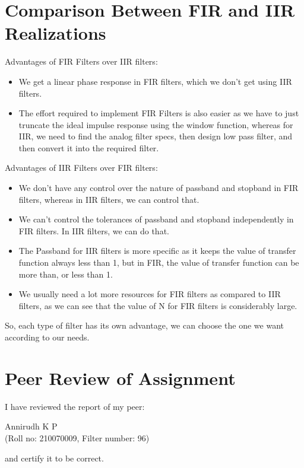\documentclass{article}
\begin{document}
\clearpage

\section{Comparison Between FIR and IIR Realizations}

Advantages of FIR Filters over IIR filters:
\begin{itemize}
    \item We get a linear phase response in FIR filters, which we don't get using IIR filters.
    \item The effort required to implement FIR Filters is also easier as we have to just truncate the ideal impulse response using the window function, whereas for IIR, we need to find the analog filter specs, then design low pass filter, and then convert it into the required filter.
\end{itemize}

Advantages of IIR Filters over FIR filters:
\begin{itemize}
    \item We don't have any control over the nature of passband and stopband in FIR filters, whereas in IIR filters, we can control that.
    \item We can't control the tolerances of passband and stopband independently in FIR filters. In IIR filters, we can do that.
    \item The Passband for IIR filters is more specific as it keeps the value of transfer function always less than 1, but in FIR, the value of transfer function can be more than, or less than 1.
    \item We usually need a lot more resources for FIR filters as compared to IIR filters, as we can see that the value of N for FIR filters is considerably large.
\end{itemize}

So, each type of filter has its own advantage, we can choose the one we want according to our needs.

\section{Peer Review of Assignment}

I have reviewed the report of my peer:

\begin{center}
    Annirudh K P\\
    (Roll no: 210070009, Filter number: 96)
\end{center}
and certify it to be correct.
\end{document}
